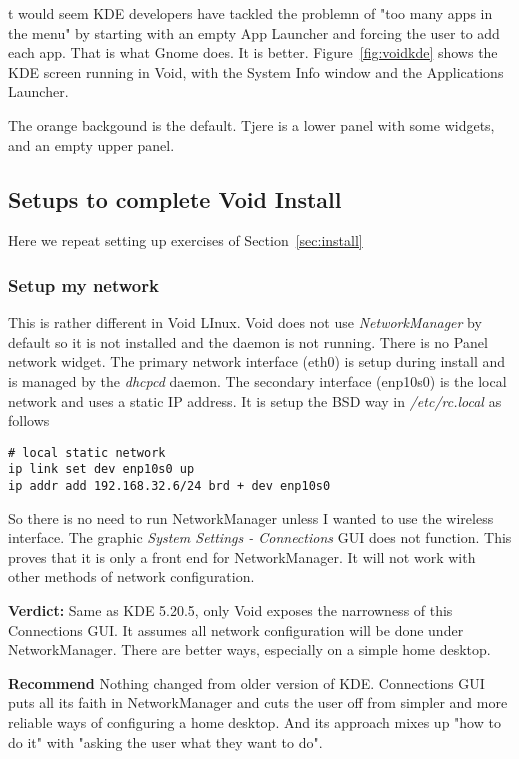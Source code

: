 \documentclass{article}  %
\begin{document}
t would seem KDE developers have tackled the problemn of "too many apps in the menu" by starting with an empty App Launcher and forcing the user to add each app. That is what Gnome does. It is better.
Figure~\ref{fig:voidkde} shows the KDE screen running in Void, with the System Info window and the Applications Launcher.

The orange backgound is the default. Tjere is a lower panel with some widgets, and an empty upper panel.


\subsection{Setups to complete Void Install }
Here we repeat setting up exercises of Section~\ref{sec:install}
\subsubsection{Setup my network}
This is rather different in Void LInux.  Void does not use {\em NetworkManager} by default so it is not installed and the daemon is not running. There is no Panel network widget.  The primary network interface (eth0) is setup during install and is managed by the {\em dhcpcd} daemon.  The secondary interface (enp10s0) is the local network and uses a static IP address. It is setup the BSD way in {\em /etc/rc.local} as follows
\begin{verbatim}
# local static network
ip link set dev enp10s0 up
ip addr add 192.168.32.6/24 brd + dev enp10s0
\end{verbatim}
So there is no need to run {NetworkManager} unless  I wanted to use the wireless interface. 
The graphic {\em System Settings - Connections} GUI does not function. This proves that it is only a front end for NetworkManager. It will not work with other methods of network configuration.

{\bf Verdict:} Same as KDE 5.20.5, only Void exposes the narrowness of this Connections GUI. It assumes all network configuration will be done under NetworkManager. There are better ways, especially on a simple home desktop.

{\bf Recommend} Nothing changed from older version of KDE. Connections GUI puts all its faith in NetworkManager and cuts the user off from simpler and more reliable ways of configuring a home desktop. And its approach mixes up "how to do it" with "asking the user what they want to do".
\end{document}
